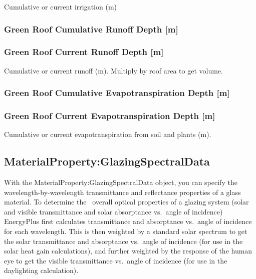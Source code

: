 Cumulative or current irrigation (m)

\subsubsection{Green Roof Cumulative Runoff Depth {[}m{]}}\label{green-roof-cumulative-runoff-depth-m}

\subsubsection{Green Roof Current Runoff Depth {[}m{]}}\label{green-roof-current-runoff-depth-m}

Cumulative or current runoff (m). Multiply by roof area to get volume.

\subsubsection{Green Roof Cumulative Evapotranspiration Depth {[}m{]}}\label{green-roof-cumulative-evapotranspiration-depth-m}

\subsubsection{Green Roof Current Evapotranspiration Depth {[}m{]}}\label{green-roof-current-evapotranspiration-depth-m}

Cumulative or current evapotranspiration from soil and plants (m).

\subsection{MaterialProperty:GlazingSpectralData}\label{materialpropertyglazingspectraldata}

With the MaterialProperty:GlazingSpectralData object, you can specify the wavelength-by-wavelength transmittance and reflectance properties of a glass material. To determine the~ overall optical properties of a glazing system (solar and visible transmittance and solar absorptance vs.~angle of incidence) EnergyPlus first calculates transmittance and absorptance vs.~angle of incidence for each wavelength. This is then weighted by a standard solar spectrum to get the solar transmittance and absorptance vs.~angle of incidence (for use in the solar heat gain calculations), and further weighted by the response of the human eye to get the visible transmittance vs.~angle of incidence (for use in the daylighting calculation).

